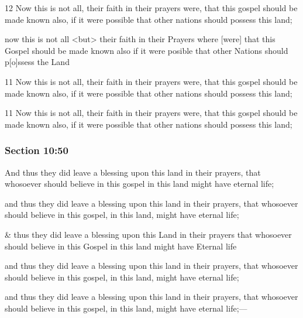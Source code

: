 		\begin{framed}
		\scriptsize
			\begin{compactdesc}
				\item[JSP] 12 Now this is not all, their faith in their prayers were, that this gospel should be made known also, if it were possible that other nations should possess this land;
				\item[RB1] now this is not all <but> their faith in their Prayers where [were] that this Gospel should be made known also if it were posible that other Nations should p[o]ssess the Land
				\item[DC 1835] 11 Now this is not all, their faith in their prayers were, that this gospel should be made known also, if it were possible that other nations should possess this land;
				\item[DC 1844] 11 Now this is not all, their faith in their prayers were, that this gospel should be made known also, if it were possible that other nations should possess this land; 
			\end{compactdesc}
		\end{framed}

	\subsubsection{Section 10:50} %
		\label{DC10-50}

		And thus they did leave a blessing upon this land in their prayers, that whosoever should believe in this gospel in this land might have eternal life;

		\begin{framed}
		\scriptsize
			\begin{compactdesc}
				\item[JSP] and thus they did leave a blessing upon this land in their prayers, that whosoever should believe in this gospel, in this land, might have eternal life;
				\item[RB1] \& thus they did leave a blessing upon this Land in their prayers that whosoever should believe in this Gospel in this land might have Eternal life
				\item[DC 1835] and thus they did leave a blessing upon this land in their prayers, that whosoever should believe in this gospel, in this land, might have eternal life;
				\item[DC 1844] and thus they did leave a blessing upon this land in their prayers, that whosoever should believe in this gospel, in this land, might have eternal life;---
			\end{compactdesc}
		\end{framed}

